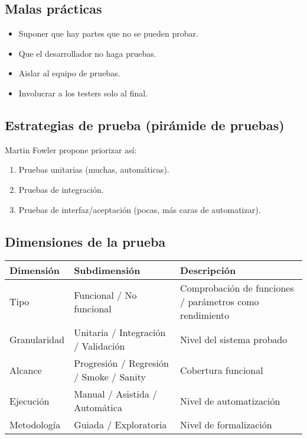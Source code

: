 \subsection{Malas prácticas}\label{subsec:malas-practicas}

\begin{itemize}
    \item Suponer que hay partes que no se pueden probar.
    \item Que el desarrollador no haga pruebas.
    \item Aislar al equipo de pruebas.
    \item Involucrar a los testers solo al final.
\end{itemize}

\subsection{Estrategias de prueba (pirámide de pruebas)}\label{subsec:estrategias-de-prueba-(piramide-de-pruebas)}

Martin Fowler propone priorizar así:

\begin{enumerate}
    \item Pruebas unitarias (muchas, automáticas).
    \item Pruebas de integración.
    \item Pruebas de interfaz/aceptación (pocas, más caras de automatizar).
\end{enumerate}

\subsection{Dimensiones de la prueba}\label{subsec:dimensiones-de-la-prueba}

\begin{center}
    \begin{tabularx}{\textwidth}{|l|l|X|}
        \hline
        \textbf{Dimensión} & \textbf{Subdimensión}                   & \textbf{Descripción}                                    \\
        \hline
        Tipo               & Funcional / No funcional                & Comprobación de funciones / parámetros como rendimiento \\
        Granularidad       & Unitaria / Integración / Validación     & Nivel del sistema probado                               \\
        Alcance            & Progresión / Regresión / Smoke / Sanity & Cobertura funcional                                     \\
        Ejecución          & Manual / Asistida / Automática          & Nivel de automatización                                 \\
        Metodología        & Guiada / Exploratoria                   & Nivel de formalización                                  \\
        \hline
    \end{tabularx}
\end{center}

